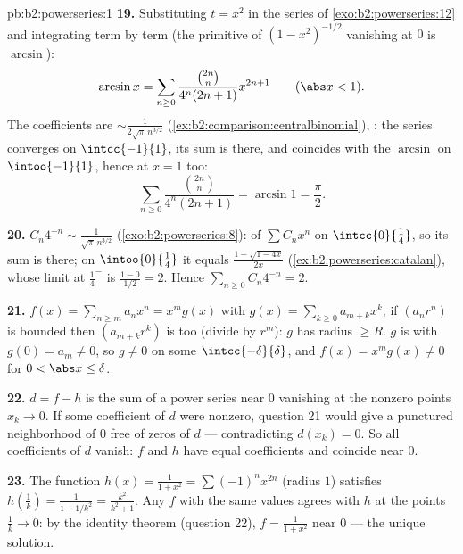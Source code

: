 \begin{solution}{pb:b2:powerseries:1}
\textbf{19.} Substituting $t = x^2$ in the series of
\cref{exo:b2:powerseries:12} and integrating term by
term (the primitive of $(1-x^2)^{-1/2}$ vanishing at $0$ is
$\arcsin$):
\[
\arcsin x = \sum_{n\geq0}
\frac{\binom{2n}n}{4^n(2n+1)}x^{2n+1}
\qquad(\abs x < 1) .
\]
The coefficients are $\sim \frac{1}{2\sqrt\pi\,n^{3/2}}$
(\cref{ex:b2:comparison:centralbinomial}), : the series
converges \emph{} on $\intcc{-1}{1}$, its sum is
 there, and coincides with the  $\arcsin$
on $\intoo{-1}{1}$, hence at $x = 1$ too:
\[
\sum_{n\geq0}\frac{\binom{2n}n}{4^n(2n+1)}
= \arcsin 1 = \frac\pi2 .
\]

\textbf{20.} $C_n4^{-n} \sim \frac{1}{\sqrt\pi\,n^{3/2}}$
(\cref{exo:b2:powerseries:8}):  of $\sum
C_nx^n$ on $\intcc{0}{\frac14}$, so its sum is 
there; on $\intoo{0}{\frac14}$ it equals
$\frac{1-\sqrt{1-4x}}{2x}$
(\cref{ex:b2:powerseries:catalan}), whose limit at
$\frac14^-$ is $\frac{1-0}{1/2} = 2$. Hence $\sum_{n\geq0}
C_n4^{-n} = 2$.

\textbf{21.} $f(x) = \sum_{n\geq m}a_nx^n = x^m g(x)$ with
$g(x) = \sum_{k\geq0}a_{m+k}x^k$; if $(a_nr^n)$ is bounded then
$(a_{m+k}r^k)$ is too (divide by $r^m$): $g$ has radius $\geq
R$. $g$ is  with $g(0) = a_m \neq 0$, so $g \neq 0$
on some $\intcc{-\delta}{\delta}$, and $f(x) = x^mg(x) \neq 0$
for $0 < \abs x \leq \delta$.

\textbf{22.} $d = f - h$ is the sum of a power series near $0$
vanishing at the nonzero points $x_k \to 0$. If some
coefficient of $d$ were nonzero, question 21 would give a
punctured neighborhood of $0$ free of zeros of $d$ ---
contradicting $d(x_k) = 0$. So all coefficients of $d$ vanish:
$f$ and $h$ have equal coefficients and coincide near $0$.

\textbf{23.} The function $h(x) = \frac{1}{1+x^2} =
\sum(-1)^nx^{2n}$ (radius $1$) satisfies $h(\frac1k) =
\frac{1}{1 + 1/k^2} = \frac{k^2}{k^2+1}$. Any  $f$ with
the same values agrees with $h$ at the points $\frac1k \to 0$:
by the identity theorem (question 22), $f = \frac{1}{1+x^2}$
near $0$ --- the unique solution.


\end{solution}
